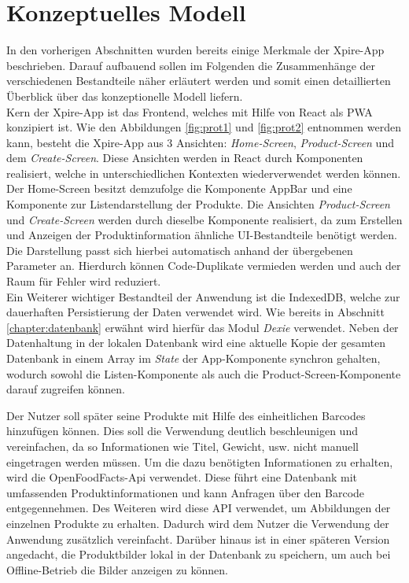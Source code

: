 \newpage
\section{Konzeptuelles Modell}

In den vorherigen Abschnitten wurden bereits einige Merkmale der Xpire-App beschrieben. Darauf aufbauend sollen im Folgenden die Zusammenhänge der verschiedenen Bestandteile näher erläutert werden und somit einen detaillierten Überblick über das konzeptionelle Modell liefern.\\
Kern der Xpire-App ist das Frontend, welches mit Hilfe von React als PWA konzipiert ist. Wie den Abbildungen \ref{fig:prot1} und \ref{fig:prot2} entnommen werden kann, besteht die Xpire-App aus 3 Ansichten: \textit{Home-Screen}, \textit{Product-Screen} und dem \textit{Create-Screen}. Diese Ansichten werden in React durch Komponenten realisiert, welche in unterschiedlichen Kontexten wiederverwendet werden können. Der Home-Screen besitzt demzufolge die Komponente AppBar und eine Komponente zur Listendarstellung der Produkte. Die Ansichten \textit{Product-Screen} und \textit{Create-Screen} werden durch dieselbe Komponente realisiert, da zum Erstellen und Anzeigen der Produktinformation ähnliche UI-Bestandteile benötigt werden. Die Darstellung passt sich hierbei automatisch anhand der übergebenen Parameter an. Hierdurch können Code-Duplikate vermieden werden und auch der Raum für Fehler wird reduziert.\\
Ein Weiterer wichtiger Bestandteil der Anwendung ist die IndexedDB, welche zur dauerhaften Persistierung der Daten verwendet wird. Wie bereits in Abschnitt \ref{chapter:datenbank} erwähnt wird hierfür das Modul \textit{Dexie} verwendet. Neben der Datenhaltung in der lokalen Datenbank wird eine aktuelle Kopie der gesamten Datenbank in einem Array im \textit{State} der App-Komponente synchron gehalten, wodurch sowohl die Listen-Komponente als auch die Product-Screen-Komponente darauf zugreifen können.

Der Nutzer soll später seine Produkte mit Hilfe des einheitlichen Barcodes hinzufügen können. Dies soll die Verwendung deutlich beschleunigen und vereinfachen, da so Informationen wie Titel, Gewicht, usw. nicht manuell eingetragen werden müssen. Um die dazu benötigten Informationen zu erhalten, wird die OpenFoodFacts-Api verwendet. Diese führt eine Datenbank mit umfassenden Produktinformationen und kann Anfragen über den Barcode entgegennehmen. Des Weiteren wird diese API verwendet, um Abbildungen der einzelnen Produkte zu erhalten. Dadurch wird dem Nutzer die Verwendung der Anwendung zusätzlich vereinfacht. Darüber hinaus ist in einer späteren Version angedacht, die Produktbilder lokal in der Datenbank zu speichern, um auch bei Offline-Betrieb die Bilder anzeigen zu können.
